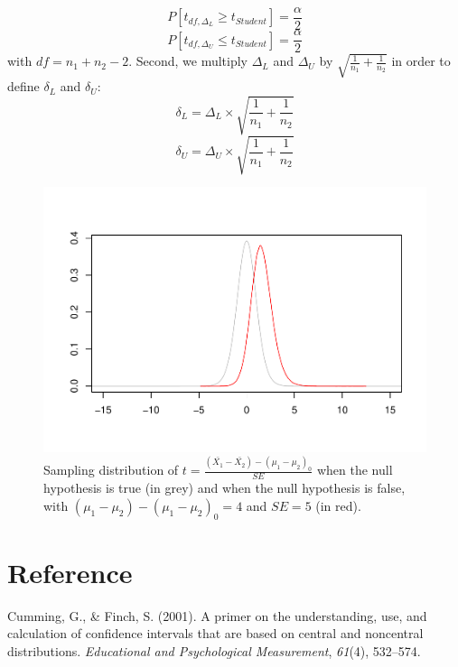 \documentclass[
  english,
  man,mask,floatsintext]{apa6}
\newlength{\cslhangindent}
\newlength{\cslentryspacingunit} %
\newenvironment{CSLReferences}[2] %
 {%
  \setlength{\parindent}{0pt}
  \ifodd #1
  \let\oldpar\par
  \def\par{\hangindent=\cslhangindent\oldpar}
  \fi
  \setlength{\parskip}{#2\cslentryspacingunit}
 }%
 {}
\begin{document}
\[P[t_{df, \Delta_L} \geq t_{Student}] = \frac{\alpha}{2} \]
\[P[t_{df, \Delta_U} \leq t_{Student}] = \frac{\alpha}{2} \]
with \(df = n_1+n_2-2\). Second, we multiply \(\Delta_L\) and \(\Delta_U\) by \(\sqrt{\frac{1}{n_1}+\frac{1}{n_2}}\) in order to define \(\delta_L\) and \(\delta_U\):
\[\delta_L = \Delta_L \times \sqrt{\frac{1}{n_1}+\frac{1}{n_2}}\]
\[\delta_U = \Delta_U \times \sqrt{\frac{1}{n_1}+\frac{1}{n_2}}\]

\begin{figure}
\centering
\includegraphics{CI_files/figure-latex/SAMPLMEANDIFF3-1.pdf}
\caption{\label{fig:SAMPLMEANDIFF3}Sampling distribution of \(t=\frac{(\bar{X_1}-\bar{X_2})-(\mu_1-\mu_2)_0}{SE}\) when the null hypothesis is true (in grey) and when the null hypothesis is false, with \((\mu_1-\mu_2)-(\mu_1-\mu_2)_0=4\) and \(SE=5\) (in red).}
\end{figure}

\hypertarget{reference}{%
\section*{Reference}\label{reference}}

\hypertarget{refs}{}
\begin{CSLReferences}{1}{0}
\leavevmode{}%
Cumming, G., \& Finch, S. (2001). A primer on the understanding, use, and calculation of confidence intervals that are based on central and noncentral distributions. \emph{{E}ducational and {P}sychological {M}easurement}, \emph{61}(4), 532--574.

\end{CSLReferences}
\end{document}
